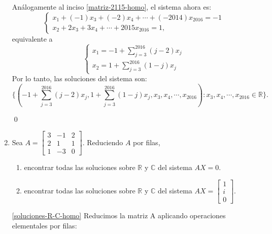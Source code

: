 \begin{enumerate}[topsep=6pt, itemsep=.4cm]
Análogamente al inciso \ref{matriz-2115-homo}, el sistema ahora es:
\begin{equation*}
\begin{cases}
x_1 + (-1)x_3 + (-2)x_4 + \cdots + (-2014)x_{2016} = -1\\
x_2 + 2 x_3 + 3 x_4 + \cdots + 2015 x_{2016} = 1,
\end{cases}
\end{equation*}
equivalente a
\begin{equation*}
\begin{cases}
x_1 = -1 + \sum_{j=3}^{2016} (j-2) x_j \\
x_2 = 1 + \sum_{j=3}^{2016} (1-j) x_j
\end{cases}
\end{equation*}
Por lo tanto,  las soluciones del sistema son:
$$\{ ( -1+\sum_{j=3}^{2016} (j-2) x_j , 1+\sum_{j=3}^{2016} (1-j) x_j , x_3 , x_4, \cdots, x_{2016}) : x_3,x_4,\cdots, x_{2016} \in \mathbb R \}.$$


\qed

     \item Sea $A=\begin{bmatrix}3 & -1 & 2 \\2 & 1 & 1 \\1&-3&0\end{bmatrix}$. Reduciendo $A$ por filas,
        \begin{enumerate}
        \item\label{soluciones-R-C-homo} encontrar todas las soluciones sobre $\mathbb{R}$ y $\mathbb{C}$ del sistema $AX=0$.
        \item\label{soluciones-R-C-no-homo} encontrar todas las soluciones sobre $\mathbb{R}$ y $\mathbb{C}$ del sistema $AX=\left[\begin{array}{c}
            1\\i\\0 \end{array}\right]$.
        \end{enumerate}

 \rta


 \ref{soluciones-R-C-homo} Reducimos la matriz A aplicando operaciones elementales por filas:


\end{enumerate}
